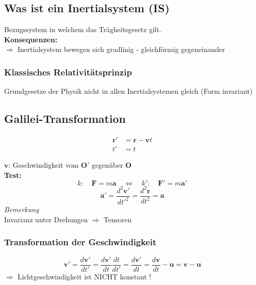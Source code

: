 \documentclass[titlepage,11pt,a4paper,ngerman]{report}
\renewcommand{\vec}[1]{\boldsymbol{#1}}
\newcommand{\frbox}[2]{\begin{tcolorbox}[colback=white,colframe=red!75!black,fonttitle=\bfseries,title=#1]#2\end{tcolorbox}}
\begin{document}
\subsection{Was ist ein Inertialsystem (IS)}
Bezugssystem in welchem das Trägheitsgesetz gilt.\\[10pt]
\textbf{Konsequenzen:}\\[5pt]
$\Rightarrow$ Inertialsystem bewegen sich gradlinig - gleichförmig gegeneinander

\subsubsection{Klassisches Relativitätsprinzip}
Grundgesetze der Physik nicht in allen Inertialsystemen gleich (Form invariant)

\subsection{Galilei-Transformation}
\frbox{Galilei-Trafo}{\begin{align*}
\vec r' &= \vec{r} - \vec{v} t \\
t' &= t
\end{align*}}
$ \vec{v} $: Geschwindigkeit vom $ \vec{O}' $ gegenüber $ \vec{O} $\\[5pt]
\textbf{Test:}
\begin{equation*}
k: \quad \vec{F} = m \vec{a} \quad \Leftrightarrow \quad k': \quad \vec{F}' = m \vec{a}'
\end{equation*}
\begin{equation*}
\vec{a}' = \frac{d^2 \vec{v}'}{dt'^2} = \frac{d^2 \vec{r}}{dt^2} = \vec{a}
\end{equation*}
\emph{Bemerkung}\\
Invarianz unter Drehungen $ \Rightarrow $ Tensoren

\subsubsection{Transformation der Geschwindigkeit}
\begin{equation*}
\vec{v}' = \frac{d\vec{v}'}{dt'} = \frac{d\vec{v}'}{dt} \frac{dt}{dt'} = \frac{d\vec{v}'}{dt} = \frac{d\vec{v}}{dt} - \vec{u} = \vec{v} - \vec{u}
\end{equation*}
$ \Rightarrow $ Lichtgeschwindigkeit ist NICHT konstant !%
\end{document}
